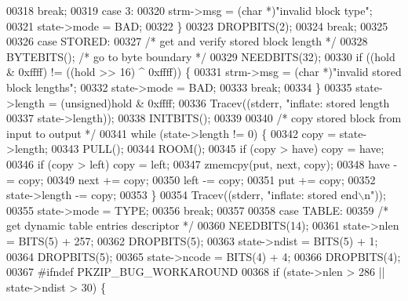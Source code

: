 \begin{DoxyCode}
{{{00318                 \textcolor{keywordflow}{break};
00319             \textcolor{keywordflow}{case} 3:
00320                 strm->msg = (\textcolor{keywordtype}{char} *)\textcolor{stringliteral}{"invalid block type"};
00321                 state->mode = BAD;
00322             \}
00323             DROPBITS(2);
00324             \textcolor{keywordflow}{break};
00325 
00326         \textcolor{keywordflow}{case} STORED:
00327             \textcolor{comment}{/* get and verify stored block length */}
00328             BYTEBITS();                         \textcolor{comment}{/* go to byte boundary */}
00329             NEEDBITS(32);
00330             \textcolor{keywordflow}{if} ((hold & 0xffff) != ((hold >> 16) ^ 0xffff)) \{
00331                 strm->msg = (\textcolor{keywordtype}{char} *)\textcolor{stringliteral}{"invalid stored block lengths"};
00332                 state->mode = BAD;
00333                 \textcolor{keywordflow}{break};
00334             \}
00335             state->length = (unsigned)hold & 0xffff;
00336             Tracev((stderr, \textcolor{stringliteral}{"inflate:       stored length %
00337                     state->length));
00338             INITBITS();
00339 
00340             \textcolor{comment}{/* copy stored block from input to output */}
00341             \textcolor{keywordflow}{while} (state->length != 0) \{
00342                 copy = state->length;
00343                 PULL();
00344                 ROOM();
00345                 \textcolor{keywordflow}{if} (copy > have) copy = have;
00346                 \textcolor{keywordflow}{if} (copy > left) copy = left;
00347                 zmemcpy(put, next, copy);
00348                 have -= copy;
00349                 next += copy;
00350                 left -= copy;
00351                 put += copy;
00352                 state->length -= copy;
00353             \}
00354             Tracev((stderr, \textcolor{stringliteral}{"inflate:       stored end\(\backslash\)n"}));
00355             state->mode = TYPE;
00356             \textcolor{keywordflow}{break};
00357 
00358         \textcolor{keywordflow}{case} TABLE:
00359             \textcolor{comment}{/* get dynamic table entries descriptor */}
00360             NEEDBITS(14);
00361             state->nlen = BITS(5) + 257;
00362             DROPBITS(5);
00363             state->ndist = BITS(5) + 1;
00364             DROPBITS(5);
00365             state->ncode = BITS(4) + 4;
00366             DROPBITS(4);
00367 \textcolor{preprocessor}{#ifndef PKZIP\_BUG\_WORKAROUND}
00368             \textcolor{keywordflow}{if} (state->nlen > 286 || state->ndist > 30) \{
}}}}
\end{DoxyCode}
